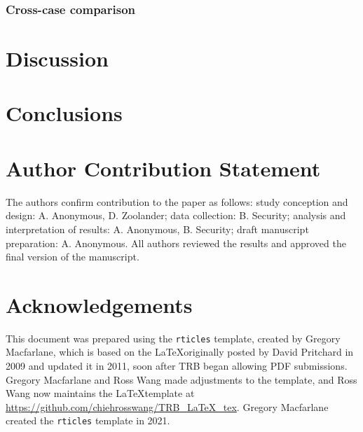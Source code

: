 \documentclass[numbered]{trbunofficial}
\begin{document}
\hypertarget{cross-case-comparison}{%
\subsubsection{Cross-case comparison}\label{cross-case-comparison}}

\hypertarget{discussion}{%
\section{Discussion}\label{discussion}}

\hypertarget{conclusions}{%
\section{Conclusions}\label{conclusions}}

\hypertarget{author-contribution-statement}{%
\section{Author Contribution
Statement}\label{author-contribution-statement}}

The authors confirm contribution to the paper as follows: study
conception and design: A. Anonymous, D. Zoolander; data collection: B.
Security; analysis and interpretation of results: A. Anonymous, B.
Security; draft manuscript preparation: A. Anonymous. All authors
reviewed the results and approved the final version of the manuscript.

\hypertarget{acknowledgements}{%
\section{Acknowledgements}\label{acknowledgements}}

This document was prepared using the \texttt{rticles} template, created
by Gregory Macfarlane, which is based on the \LaTeX originally posted by
David Pritchard in 2009 and updated it in 2011, soon after TRB began
allowing PDF submissions. Gregory Macfarlane and Ross Wang made
adjustments to the template, and Ross Wang now maintains the
\LaTeX template at \url{https://github.com/chiehrosswang/TRB_LaTeX_tex}.
Gregory Macfarlane created the \texttt{rticles} template in 2021.

\newpage
\renewcommand\refname{References}

\end{document}
